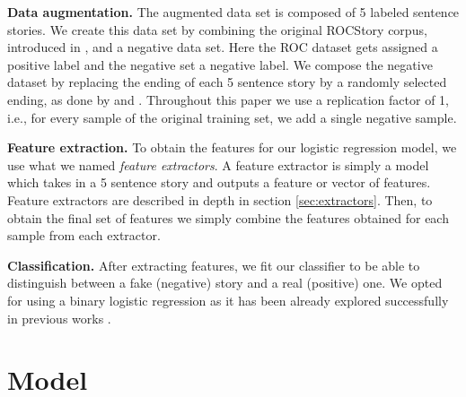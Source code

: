 \documentclass{article}
\begin{document}
\textbf{Data augmentation.} The augmented data set is composed of 5 labeled
sentence stories. We create this data set by combining the original ROCStory
corpus, introduced in \cite{ROCstories}, and a negative data set. Here the ROC
dataset gets assigned a positive label and the negative set a negative label. We
compose the negative dataset by replacing the ending of each 5 sentence story by
a randomly selected ending, as done by \cite{LSTMClassifier} and
\cite{SENTENCE_EMB}. Throughout this paper we use a replication factor of 1,
i.e., for every sample of the original training set, we add a single negative
sample.

\textbf{Feature extraction.} To obtain the features for our logistic regression
model, we use what we named {\it feature extractors}. A feature extractor is
simply a model which takes in a 5 sentence story and outputs a feature or vector
of features. Feature extractors are described in depth in section
\ref{sec:extractors}. Then, to obtain the final set of features we simply
combine the features obtained for each sample from each extractor.

\textbf{Classification.} After extracting features, we fit our classifier to be
able to distinguish between a fake (negative) story and a real (positive) one.
We opted for using a binary logistic regression as it has been already explored
successfully in previous works \cite{UWNLP,Goel,COGCOMP}.


\section{Model}
\end{document}
